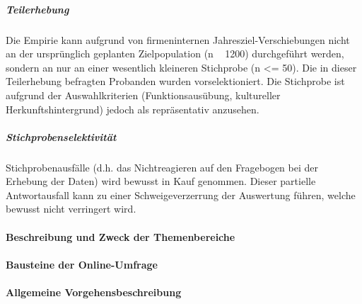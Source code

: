 \subparagraph*{Teilerhebung}\mbox{}

\begin{sloppypar}
Die Empirie kann aufgrund von firmeninternen Jahresziel-Verschiebungen nicht an der ursprünglich geplanten Zielpopulation (n ~ 1200) durchgeführt werden, sondern an nur an einer wesentlich kleineren Stichprobe (n <= 50). Die in dieser Teilerhebung befragten Probanden wurden vorselektioniert. Die Stichprobe ist aufgrund der Auswahlkriterien (Funktionsausübung, kultureller Herkunftshintergrund) jedoch als repräsentativ anzusehen.
\end{sloppypar}

\subparagraph*{Stichprobenselektivität}\mbox{}

\begin{sloppypar}
Stichprobenausfälle (d.h. das Nichtreagieren auf den Fragebogen bei der Erhebung der Daten) wird bewusst in Kauf genommen. Dieser partielle Antwortausfall kann zu einer Schweigeverzerrung der Auswertung führen, welche bewusst nicht verringert wird. 
\end{sloppypar}

\paragraph*{Beschreibung und Zweck der Themenbereiche}\mbox{}

\begin{sloppypar}

\end{sloppypar}


\paragraph*{Bausteine der Online-Umfrage}\mbox{}

\begin{sloppypar}

\end{sloppypar}


\paragraph*{Allgemeine Vorgehensbeschreibung}\mbox{}

\begin{sloppypar}

\end{sloppypar}
